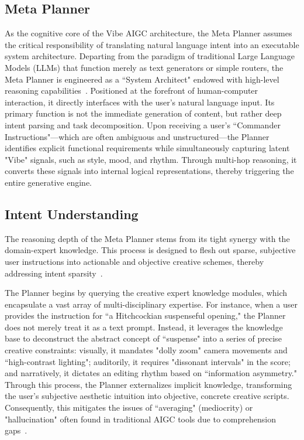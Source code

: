 \documentclass{article}
\begin{document}
\subsection{Meta Planner}

As the cognitive core of the Vibe AIGC architecture, the Meta Planner assumes the critical responsibility of translating natural language intent into an executable system architecture. Departing from the paradigm of traditional Large Language Models (LLMs) that function merely as text generators or simple routers, the Meta Planner is engineered as a ``System Architect" endowed with high-level reasoning capabilities~\citep{goebel2025llmreasoningmodelsreplaceclassical}. Positioned at the forefront of human-computer interaction, it directly interfaces with the user’s natural language input. Its primary function is not the immediate generation of content, but rather deep intent parsing and task decomposition. Upon receiving a user’s ``Commander Instructions"—which are often ambiguous and unstructured—the Planner identifies explicit functional requirements while simultaneously capturing latent "Vibe" signals, such as style, mood, and rhythm. Through multi-hop reasoning, it converts these signals into internal logical representations, thereby triggering the entire generative engine.

\subsection{Intent Understanding}

The reasoning depth of the Meta Planner stems from its tight synergy with the domain-expert knowledge. This process is designed to flesh out sparse, subjective user instructions into actionable and objective creative schemes, thereby addressing intent sparsity~\citep{fagnoni2025opuspromptintentionframework}.

The Planner begins by querying the creative expert knowledge modules, which encapsulate a vast array of multi-disciplinary expertise. For instance, when a user provides the instruction for ``a Hitchcockian suspenseful opening," the Planner does not merely treat it as a text prompt. Instead, it leverages the knowledge base to deconstruct the abstract concept of ``suspense" into a series of precise creative constraints: visually, it mandates "dolly zoom" camera movements and ``high-contrast lighting"; auditorily, it requires "dissonant intervals" in the score; and narratively, it dictates an editing rhythm based on ``information asymmetry." Through this process, the Planner externalizes implicit knowledge, transforming the user’s subjective aesthetic intuition into objective, concrete creative scripts. Consequently, this mitigates the issues of ``averaging" (mediocrity) or "hallucination" often found in traditional AIGC tools due to comprehension gaps~\citep{shi2025flowagentachievingcomplianceflexibility}.
\end{document}
